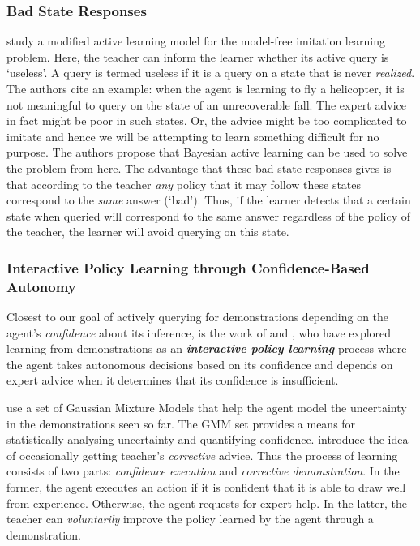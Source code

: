 \subsubsection{Bad State Responses}
\label{sec:bad_state}
\citet{judah2011active} study a modified active learning model for the model-free imitation learning problem. Here, the teacher can inform the learner whether its active query is `useless'. A query is termed useless if it is a query on a state that is never \textit{realized}. The authors cite an example: when the agent is learning to fly a helicopter, it is not meaningful to query on the state of an unrecoverable fall. The expert advice in fact might be poor in such states. Or, the advice might be too complicated to imitate and hence we will be attempting to learn something difficult for no purpose. 
The authors propose that Bayesian active learning can be used to solve the problem from here. The advantage that these bad state responses gives is that according to the teacher \textit{any} policy that it may follow these states correspond to the \textit{same} answer (`bad'). Thus, if the learner detects that a certain state when queried will correspond to the same answer regardless of the policy of the teacher, the learner will avoid querying on this state. \\


\subsubsection{Interactive Policy Learning through Confidence-Based Autonomy}
\label{sec:interactive}
Closest to our goal of actively querying for demonstrations depending on the agent's \textit{confidence} about its inference, is the work of  \citet{Chernova:2009:IPL:1622716.1622717} and \citet{Chernova:2007:CPL:1329125.1329407}, who have explored learning from demonstrations as an \textit{\textbf{interactive policy learning}} process where the agent takes autonomous decisions based on its confidence and depends on expert advice when it determines that its confidence is insufficient. 

\citet{Chernova:2007:CPL:1329125.1329407} use a set of Gaussian Mixture Models that help the agent model the uncertainty in the demonstrations seen so far. The GMM set provides a means for statistically analysing uncertainty and quantifying confidence.  \citet{Chernova:2009:IPL:1622716.1622717} introduce the idea of occasionally getting teacher's \textit{corrective} advice.  Thus the process of learning consists of two parts: \textit{confidence execution} and \textit{corrective demonstration}. In the former, the agent executes an action if it is confident that it is able to draw well from experience. Otherwise, the agent requests for expert help. In the latter, the teacher can \textit{voluntarily} improve the policy learned by the agent through a demonstration. 

